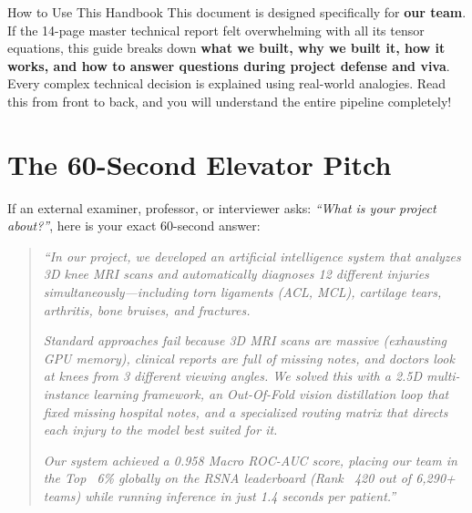 \documentclass[11pt,a4paper]{article}
\begin{document}
\vspace{0.05in}

\begin{conceptbox}{How to Use This Handbook}
This document is designed specifically for \textbf{our team}. If the 14-page master technical report felt overwhelming with all its tensor equations, this guide breaks down \textbf{what we built, why we built it, how it works, and how to answer questions during project defense and viva}. Every complex technical decision is explained using real-world analogies. Read this from front to back, and you will understand the entire pipeline completely!
\end{conceptbox}

\vspace{0.1in}

\section{The 60-Second Elevator Pitch}

If an external examiner, professor, or interviewer asks: \textit{“What is your project about?”}, here is your exact 60-second answer:

\begin{quote}
\textit{“In our project, we developed an artificial intelligence system that analyzes 3D knee MRI scans and automatically diagnoses 12 different injuries simultaneously---including torn ligaments (ACL, MCL), cartilage tears, arthritis, bone bruises, and fractures.}

\textit{Standard approaches fail because 3D MRI scans are massive (exhausting GPU memory), clinical reports are full of missing notes, and doctors look at knees from 3 different viewing angles. We solved this with a 2.5D multi-instance learning framework, an Out-Of-Fold vision distillation loop that fixed missing hospital notes, and a specialized routing matrix that directs each injury to the model best suited for it.}

\textit{Our system achieved a 0.958 Macro ROC-AUC score, placing our team in the Top ~6\% globally on the RSNA leaderboard (Rank ~420 out of 6,290+ teams) while running inference in just 1.4 seconds per patient.”}
\end{quote}
\end{document}
